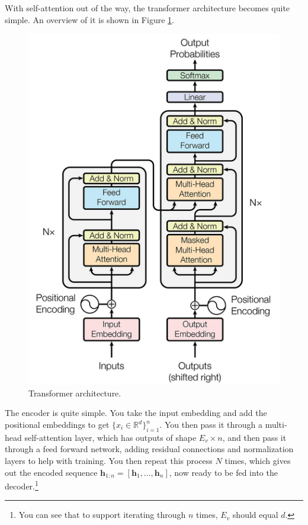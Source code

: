     With self-attention out of the way, the transformer architecture becomes quite simple. An overview of it is shown in Figure \ref{fig:transformer}. 

    \begin{figure}[H]
      \centering 
      \includegraphics[scale=1.3]{img/transformer.png}
      \caption{Transformer architecture. } 
      \label{fig:transformer}
    \end{figure}

    The encoder is quite simple. You take the input embedding and add the positional embeddings to get $\{x_i \in \mathbb{R}^d\}_{i=1}^n$. You then pass it through a multi-head self-attention layer, which has outputs of shape $E_v \times n$, and then pass it through a feed forward network, adding residual connections and normalization layers to help with training. You then repeat this process $N$ times, which gives out the encoded sequence $\mathbf{h}_{1:n} = [\mathbf{h}_1, \ldots, \mathbf{h}_n]$, now ready to be fed into the decoder.\footnote{You can see that to support iterating through $n$ times, $E_v$ should equal $d$.}

